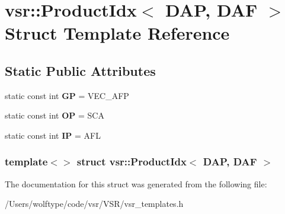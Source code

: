 \hypertarget{structvsr_1_1_product_idx_3_01_d_a_p_00_01_d_a_f_01_4}{\section{vsr\-:\-:Product\-Idx$<$ D\-A\-P, D\-A\-F $>$ Struct Template Reference}
\label{structvsr_1_1_product_idx_3_01_d_a_p_00_01_d_a_f_01_4}
}
\subsection*{Static Public Attributes}
\begin{DoxyCompactItemize}
\item 
\hypertarget{structvsr_1_1_product_idx_3_01_d_a_p_00_01_d_a_f_01_4_a636f03342b3dda831a4bafac8fcd5658}{static const int {\bfseries G\-P} = V\-E\-C\-\_\-\-A\-F\-P}\label{structvsr_1_1_product_idx_3_01_d_a_p_00_01_d_a_f_01_4_a636f03342b3dda831a4bafac8fcd5658}

\item 
\hypertarget{structvsr_1_1_product_idx_3_01_d_a_p_00_01_d_a_f_01_4_a3ee4748bc812f6b28001ee32122135ba}{static const int {\bfseries O\-P} = S\-C\-A}\label{structvsr_1_1_product_idx_3_01_d_a_p_00_01_d_a_f_01_4_a3ee4748bc812f6b28001ee32122135ba}

\item 
\hypertarget{structvsr_1_1_product_idx_3_01_d_a_p_00_01_d_a_f_01_4_a2fd72e487d3061de6377504d5f773fba}{static const int {\bfseries I\-P} = A\-F\-L}\label{structvsr_1_1_product_idx_3_01_d_a_p_00_01_d_a_f_01_4_a2fd72e487d3061de6377504d5f773fba}

\end{DoxyCompactItemize}
\subsubsection*{template$<$$>$ struct vsr\-::\-Product\-Idx$<$ D\-A\-P, D\-A\-F $>$}



The documentation for this struct was generated from the following file\-:\begin{DoxyCompactItemize}
\item 
/\-Users/wolftype/code/vsr/\-V\-S\-R/vsr\-\_\-templates.\-h\end{DoxyCompactItemize}
